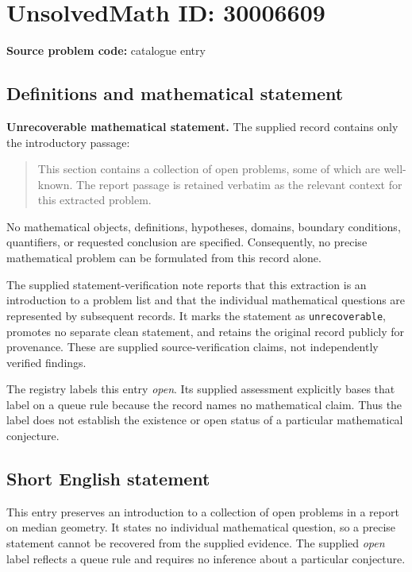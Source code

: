 \documentclass[11pt]{article}
\begin{document}
\section*{UnsolvedMath ID: 30006609}
\textbf{Source problem code:} catalogue entry
\subsection{Definitions and mathematical statement}
\textbf{Unrecoverable mathematical statement.} The supplied record contains only the introductory passage:
\begin{quote}
This section contains a collection of open problems, some of which are well-known. The report passage is retained verbatim as the relevant context for this extracted problem.
\end{quote}
No mathematical objects, definitions, hypotheses, domains, boundary conditions, quantifiers, or requested conclusion are specified. Consequently, no precise mathematical problem can be formulated from this record alone.

The supplied statement-verification note reports that this extraction is an introduction to a problem list and that the individual mathematical questions are represented by subsequent records. It marks the statement as \texttt{unrecoverable}, promotes no separate clean statement, and retains the original record publicly for provenance. These are supplied source-verification claims, not independently verified findings.

The registry labels this entry \emph{open}. Its supplied assessment explicitly bases that label on a queue rule because the record names no mathematical claim. Thus the label does not establish the existence or open status of a particular mathematical conjecture.
\subsection{Short English statement}
This entry preserves an introduction to a collection of open problems in a report on median geometry. It states no individual mathematical question, so a precise statement cannot be recovered from the supplied evidence. The supplied \emph{open} label reflects a queue rule and requires no inference about a particular conjecture.
\end{document}

